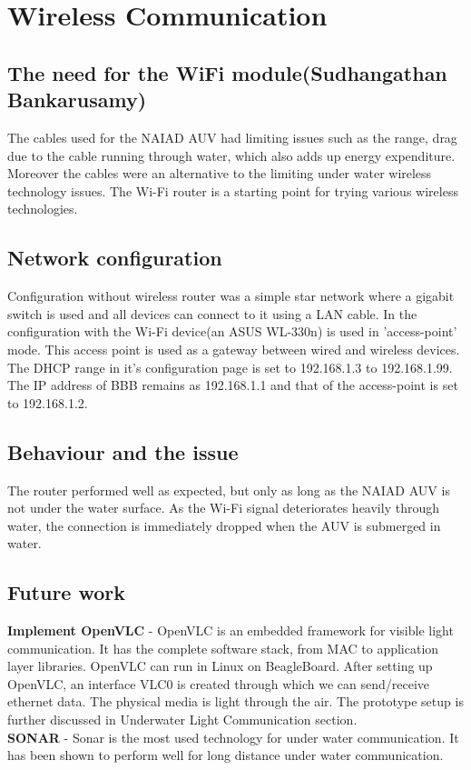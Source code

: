 

\section{Wireless Communication}
\label{sec:WirelessCommunication}


\subsection{The need for the WiFi module(Sudhangathan Bankarusamy)}
The cables used for the NAIAD AUV had limiting issues such as the range, drag due to the cable running through water, which also adds up energy expenditure. Moreover the cables were an alternative to the limiting under water wireless technology issues. 
The Wi-Fi router is a starting point for trying various wireless technologies. 
\subsection{Network configuration}


Configuration without wireless router was a simple star network where a gigabit switch is used and all devices can connect to it using a LAN cable.
In the configuration with the Wi-Fi device(an ASUS WL-330n) is used in 'access-point' mode. This access point is used as a gateway between wired and wireless devices. The DHCP range in it's configuration page is set to 192.168.1.3 to 192.168.1.99.\\
The IP address of BBB remains as 192.168.1.1 and that of the access-point is set to 192.168.1.2.

\subsection{Behaviour and the issue}
The router performed well as expected, but only as long as the NAIAD AUV is not under the water surface. As the Wi-Fi signal deteriorates heavily through water, the connection is immediately dropped when the AUV is submerged in water.


\subsection{Future work}
\textbf{Implement OpenVLC} - OpenVLC is an embedded framework for visible light communication. It has the complete software stack, from MAC to application layer libraries. OpenVLC can run in Linux on BeagleBoard. After setting up OpenVLC, an interface VLC0 is created through which we can send/receive ethernet data. The physical media is light through the air. The prototype setup is further discussed in Underwater Light Communication section.\\
\textbf{SONAR} - Sonar is the most used technology for under water communication. It has been shown to perform well for long distance under water communication.\\